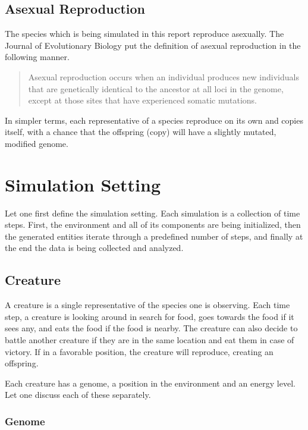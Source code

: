 \documentclass{article}
\begin{document}
\subsection{Asexual Reproduction}

The species which is being simulated in this report reproduce asexually. The Journal of Evolutionary Biology put the definition of asexual reproduction in the following manner.

\begin{quotation}
    Asexual reproduction occurs when an individual produces new individuals that are genetically identical to the ancestor at all loci in the genome, except at those sites that have experienced somatic mutations.
\end{quotation}

In simpler terms, each representative of a species reproduce on its own and copies itself, with a chance that the offspring (copy) will have a slightly mutated, modified genome.

\section{Simulation Setting}

Let one first define the simulation setting. Each simulation is a collection of time steps. First, the environment and all of its components are being initialized, then the generated entities iterate through a predefined number of steps, and finally at the end the data is being collected and analyzed.

\subsection{Creature}

A creature is a single representative of the species one is observing. Each time step, a creature is looking around in search for food, goes towards the food if it sees any, and eats the food if the food is nearby. The creature can also decide to battle another creature if they are in the same location and eat them in case of victory. If in a favorable position, the creature will reproduce, creating an offspring.

Each creature has a genome, a position in the environment and an energy level. Let one discuss each of these separately.

\subsubsection{Genome}
\end{document}
